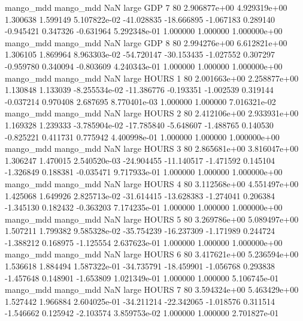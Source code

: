 mango_mdd mango_mdd                   NaN      large      GDP                 7 80 2.906877e+00   4.929319e+00      1.300638       1.599149  5.107822e-02    -41.028835    -18.666895    -1.067183       0.289140 -0.945421   0.347326    -0.631964   5.292348e-01            1.000000        1.000000        1.000000e+00
mango_mdd mango_mdd                   NaN      large      GDP                 8 80 2.994276e+00   6.612821e+00      1.306105       1.869964  8.963303e-02    -54.720147    -30.153435    -1.027552       0.307297 -0.959780   0.340094    -0.803609   4.240343e-01            1.000000        1.000000        1.000000e+00
mango_mdd mango_mdd                   NaN      large    HOURS                 1 80 2.001663e+00   2.258877e+00      1.130848       1.133039 -8.255534e-02    -11.386776     -0.193351    -1.002539       0.319144 -0.037214   0.970408     2.687695   8.770401e-03            1.000000        1.000000        7.016321e-02
mango_mdd mango_mdd                   NaN      large    HOURS                 2 80 2.412106e+00   2.933931e+00      1.169328       1.239333 -3.785904e-02    -17.785840     -5.648607    -1.488765       0.140530 -0.825221   0.411731     0.775942   4.400998e-01            1.000000        1.000000        1.000000e+00
mango_mdd mango_mdd                   NaN      large    HOURS                 3 80 2.865681e+00   3.816047e+00      1.306247       1.470015  2.540520e-03    -24.904455    -11.140517    -1.471592       0.145104 -1.326849   0.188381    -0.035471   9.717933e-01            1.000000        1.000000        1.000000e+00
mango_mdd mango_mdd                   NaN      large    HOURS                 4 80 3.112568e+00   4.551497e+00      1.425068       1.649926  2.825713e-02    -31.614415    -13.628383    -1.274041       0.206384 -1.345130   0.182432    -0.363203   7.174235e-01            1.000000        1.000000        1.000000e+00
mango_mdd mango_mdd                   NaN      large    HOURS                 5 80 3.269786e+00   5.089497e+00      1.507211       1.799382  9.585328e-02    -35.754239    -16.237309    -1.171989       0.244724 -1.388212   0.168975    -1.125554   2.637623e-01            1.000000        1.000000        1.000000e+00
mango_mdd mango_mdd                   NaN      large    HOURS                 6 80 3.417621e+00   5.236594e+00      1.536618       1.884494  1.587322e-01    -34.735791    -18.459901    -1.056768       0.293838 -1.457648   0.148901    -1.653809   1.021349e-01            1.000000        1.000000        5.106745e-01
mango_mdd mango_mdd                   NaN      large    HOURS                 7 80 3.594324e+00   5.463429e+00      1.527442       1.966884  2.604025e-01    -34.211214    -22.342065    -1.018576       0.311514 -1.546662   0.125942    -2.103574   3.859753e-02            1.000000        1.000000        2.701827e-01

